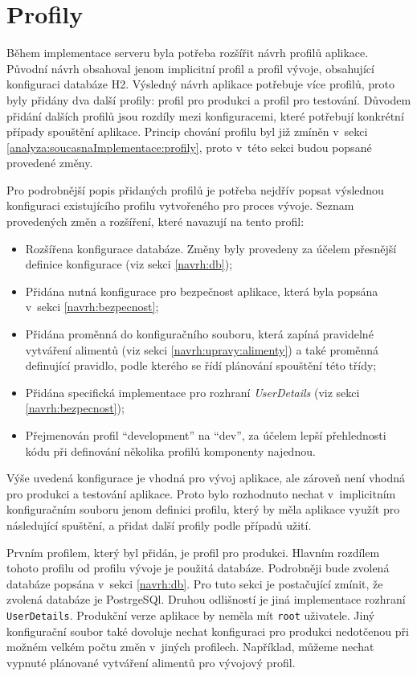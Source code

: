 \section{Profily}\label{navrh:profily}
    Během implementace serveru byla potřeba rozšířit návrh profilů aplikace. Původní návrh obsahoval jenom implicitní profil a profil vývoje, obsahující konfiguraci databáze H2. Výsledný návrh aplikace potřebuje více profilů, proto byly přidány dva další profily: profil pro produkci a profil pro testování. Důvodem přidání dalších profilů jsou rozdíly mezi konfiguracemi, které potřebují konkrétní případy spouštění aplikace. Princip chování profilu byl již zmíněn v~sekci \ref{analyza:soucasnaImplementace:profily}, proto v~této sekci budou popsané provedené změny.
    
    Pro podrobnější popis přidaných profilů je potřeba nejdřív popsat výslednou konfiguraci existujícího profilu vytvořeného pro proces vývoje. Seznam provedených změn a rozšíření, které navazují na tento profil:
    \begin{itemize}
            \item Rozšířena konfigurace databáze. Změny byly provedeny za účelem přesnější definice konfigurace (viz sekci \ref{navrh:db});
            \item Přidána nutná konfigurace pro bezpečnost aplikace, která byla popsána v~sekci \ref{navrh:bezpecnost};
            \item Přidána proměnná do konfiguračního souboru, která zapíná pravidelné vytváření alimentů (viz sekci \ref{navrh:upravy:alimenty}) a také proměnná definující pravidlo, podle kterého se řídí plánování spouštění této třídy;
            \item Přidána specifická implementace pro rozhraní \textit{UserDetails} (viz sekci \ref{navrh:bezpecnost});
            \item Přejmenován profil \enquote{development} na \enquote{dev}, za účelem lepší přehlednosti kódu při definování několika profilů komponenty najednou.
    \end{itemize}
    
    Výše uvedená konfigurace je vhodná pro vývoj aplikace, ale zároveň není vhodná pro produkci a testování aplikace. Proto bylo rozhodnuto nechat v~implicitním konfiguračním souboru jenom definici profilu, který by měla aplikace využít pro následující spuštění, a přidat další profily podle případů užití.
    
    Prvním profilem, který byl přidán, je profil pro produkci. Hlavním rozdílem tohoto profilu od profilu vývoje je použitá databáze. Podrobněji bude zvolená databáze popsána v~sekci \ref{navrh:db}. Pro tuto sekci je postačující zmínit, že zvolená databáze je PostrgeSQl. Druhou odlišností je jiná implementace rozhraní \verb|UserDetails|. Produkční verze aplikace by neměla mít \verb|root| uživatele. Jiný konfigurační soubor také dovoluje nechat konfiguraci pro produkci nedotčenou při možném velkém počtu změn v~jiných profilech.
    Například, můžeme nechat vypnuté plánované vytváření alimentů pro vývojový profil.
    
